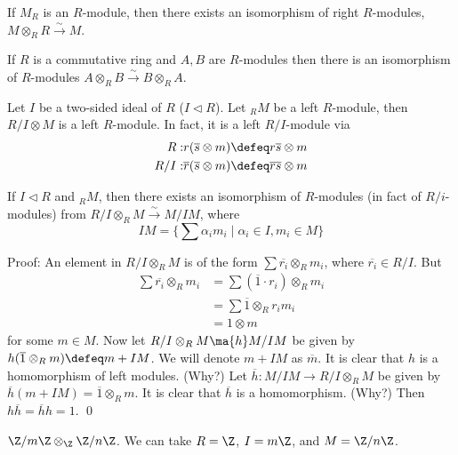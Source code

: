 \begin{prop}
If $M_R$ is an $R$-module, then there exists an isomorphism of right $R$-modules, $M \otimes_R R \stackrel{\sim}{\rightarrow} M$. 
\end{prop}

\begin{prop}
If $R$ is a commutative ring and $A,B$ are $R$-modules then there is an isomorphism of $R$-modules $A \otimes_R B \stackrel{\sim}{\rightarrow} B \otimes_R A$. 
\end{prop}

\begin{prop}
Let $I$ be a two-sided ideal of $R$ ($I \lhd R$). Let $_R M$ be a left $R$-module, then $R/I \otimes M$ is a left $R$-module. In fact, it is a left $R/I$-module via 
\[
\begin{split}
R:& r(\overline{s} \otimes m) \defeq r\overline{s} \otimes m \\
R/I:& \overline{r}(\overline{s} \otimes m) \defeq \overline{rs} \otimes m
\end{split}
\]
\end{prop}

\begin{thm}
If $I \lhd R$ and $_R M$, then there exists an isomorphism of $R$-modules (in fact of $R/i$-modules) from $R/I\otimes_R M \stackrel{\sim}{\rightarrow} M/IM$, where
\[
IM=\{\sum \alpha_i m_i \;|\; \alpha_i \in I,m_i\in M\}
\]
\end{thm}

Proof: An element in $R/I \otimes_R M$ is of the form $\sum \overline{r_i} \otimes_R m_i$, where $\overline{r_i} \in R/I$. But
\[
\begin{split}
\sum \overline{r_i} \otimes_R m_i &= \sum (\overline{1} \cdot r_i) \otimes_R m_i \\
&= \sum \overline{1} \otimes_R r_im_i \\
&=1 \otimes m
\end{split}
\]
for some $m \in M$. Now let $R/I \otimes_R M \ma{h} M/IM$ be given by $h(\overline{1} \otimes_R m) \defeq m+IM$. We will denote $m+IM$ as $\overline{m}$. It is clear that $h$ is a homomorphism of left modules. (Why?) Let $\overline{h}: M/IM \rightarrow R/I \otimes_R M$ be given by $\overline{h}(m+IM)=\overline{1} \otimes_R m$. It is clear that $\overline{h}$ is a homomorphism. (Why?) Then $h \overline{h}=\overline{h}h=1$. \qed \\

\begin{ex}
$\Z/m\Z \otimes_\Z \Z/n\Z$. We can take $R=\Z$, $I=m\Z$, and $M=\Z/n\Z$. 
\end{ex}

